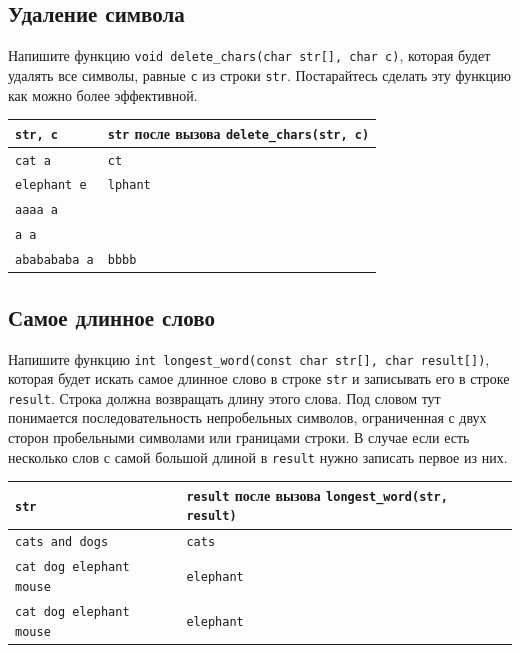 \documentclass{article}
\begin{document}
\subsection{Удаление символа}
Напишите функцию \texttt{void delete\_chars(char str[], char c)}, которая будет удалять все символы, равные \texttt{c} из строки \texttt{str}. Постарайтесь сделать эту функцию как можно более эффективной.

\begin{center}
\begin{tabular}{ l | l }
 \texttt{str, c} & \texttt{str} после вызова \texttt{delete\_chars(str, c)} \\ \hline
 \texttt{cat a} & \texttt{ct} \\
 \texttt{elephant e} & \texttt{lphant} \\
 \texttt{aaaa a} & \texttt{} \\
 \texttt{a a} & \texttt{} \\
 \texttt{ababababa a} & \texttt{bbbb} \\
\end{tabular}
\end{center}


\subsection{Самое длинное слово}
Напишите функцию \texttt{int longest\_word(const char str[], char result[])}, которая будет искать самое длинное слово в строке \texttt{str} и записывать его в строке \texttt{result}. Строка должна возвращать длину этого слова. Под словом тут понимается последовательность непробельных символов, ограниченная с двух сторон пробельными символами или границами строки.
В случае если есть несколько слов с самой большой длиной в \texttt{result} нужно записать первое из них.

\begin{center}
\begin{tabular}{ l | l }
 \texttt{str} & \texttt{result} после вызова \texttt{longest\_word(str, result)} \\ \hline
 \texttt{cats and dogs} & \texttt{cats} \\
 \texttt{cat dog elephant mouse} & \texttt{elephant} \\
 \texttt{cat \quad dog \quad\quad elephant mouse} & \texttt{elephant} \\
\end{tabular}
\end{center}
\end{document}

